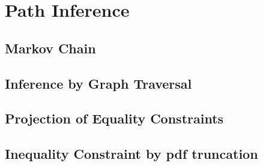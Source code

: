 \documentclass{article}
\begin{document}
\section{Path Inference}\label{Sec:Mapmatch}

\subsection{Markov Chain}\label{Sec:Markov}

\subsection{Inference by Graph Traversal}\label{Sec:Graph}

\subsection{Projection of Equality Constraints}\label{Sec:EqConstraint}

\subsection{Inequality Constraint by \gls{pdf} truncation}\label{Sec:IneqConstraint}
\end{document}
